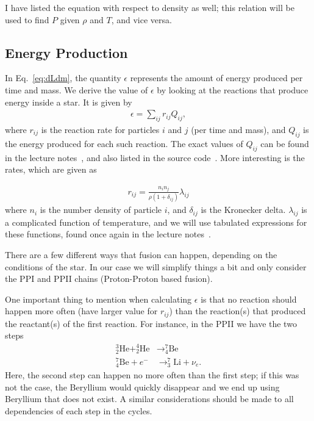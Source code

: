 \documentclass[11pt,twocolumn]{article}
\begin{document}
I have listed the equation with respect to density as well; this
relation will be used to find $P$ given $\rho$ and $T$, and vice
versa.


\subsection{Energy Production}
\label{sec:energyproduction}
In Eq.~\eqref{eq:dLdm}, the quantity $\epsilon$ represents the amount
of energy produced per time and mass. We derive the value of
$\epsilon$ by looking at the reactions that produce energy inside a
star. It is given by
\begin{align}
  \epsilon = \sum_{ij}r_{ij}Q_{ij},
\end{align}
where $r_{ij}$ is the reaction rate for particles $i$ and $j$ (per
time and mass), and $Q_{ij}$ is the energy produced for each such
reaction. The exact values of $Q_{ij}$ can be found in the lecture
notes~\cite{lecture-notes}, and also listed in the source
code~\cite[\texttt{reaction\_energies.h}]{github}. More interesting is the rates, which are given as

\begin{align}
  r_{ij} = \frac{n_in_j}{\rho(1+\delta_{ij})}\lambda_{ij}
\end{align}
where $n_i$ is the number density of particle $i$, and $\delta_{ij}$
is the Kronecker delta. $\lambda_{ij}$ is a complicated function of
temperature, and we will use tabulated expressions for these
functions, found once again in the lecture notes~\cite[Table
3.1]{lecture-notes}.


There are a few different ways that fusion can happen, depending
on the conditions of the star. In our case we will simplify things a
bit and only consider the PPI and PPII chains (Proton-Proton based
fusion). 

One important thing to mention when calculating $\epsilon$ is that no
reaction should happen more often (have larger value for $r_{ij}$)
than the reaction(s) that produced the reactant(s) of the first
reaction. For instance, in the PPII we have the two steps
\begin{align}
  ^3_2\text{He} + ^4_2\text{He}&\rightarrow ^7_4\text{Be}\\
  ^7_4\text{Be} + e^-&\rightarrow ^7_3\text{Li} + \nu_e.
\end{align}
Here, the second step can happen no more often than the first step; if
this was not the case, the Beryllium would quickly disappear and we
end up using Beryllium that does not exist. A similar considerations
should be made to all dependencies of each step in the cycles.
\end{document}
